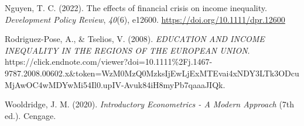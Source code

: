\documentclass[
  a4paper,
  DIV=11,
  numbers=noendperiod]{scrartcl}
\newlength{\cslhangindent}
\newlength{\cslentryspacingunit} %
\newenvironment{CSLReferences}[2] %
 {%
  \setlength{\parindent}{0pt}
  \ifodd #1
  \let\oldpar\par
  \def\par{\hangindent=\cslhangindent\oldpar}
  \fi
  \setlength{\parskip}{#2\cslentryspacingunit}
 }%
 {}
\begin{document}
\begin{CSLReferences}{1}{0}
\leavevmode{}%
Nguyen, T. C. (2022). The effects of financial crisis on income
inequality. \emph{Development Policy Review}, \emph{40}(6), e12600.
\url{https://doi.org/10.1111/dpr.12600}

\leavevmode{}%
Rodriguez-Pose, A., \& Tselios, V. (2008). \emph{{EDUCATION AND INCOME
INEQUALITY IN THE REGIONS OF THE EUROPEAN UNION}}.
https://click.endnote.com/viewer?doi=10.1111\%2Fj.1467-9787.2008.00602.x\&token=WzM0MzQ0MzksIjEwLjExMTEvai4xNDY3LTk3ODcuMjAwOC4wMDYwMi54Il0.upIV-Avuk84iH8myPb7qaaaJIQk.

\leavevmode{}%
Wooldridge, J. M. (2020). \emph{Introductory {Econometrics} - {A Modern
Approach}} (7th ed.). {Cengage}.

\end{CSLReferences}
\end{document}
